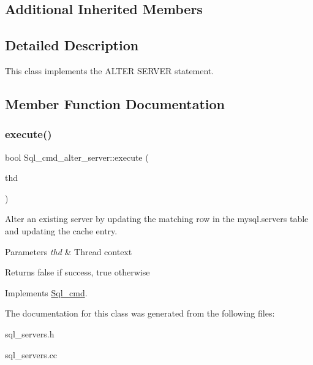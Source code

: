 \subsection*{Additional Inherited Members}


\subsection{Detailed Description}
This class implements the A\+L\+T\+ER S\+E\+R\+V\+ER statement. 

\subsection{Member Function Documentation}
\mbox{\label{classSql__cmd__alter__server_a3f4f8ff26edf3f1780fc7ab7a98ccd2d}} 
\subsubsection{\texorpdfstring{execute()}{execute()}}
{\footnotesize\ttfamily bool Sql\+\_\+cmd\+\_\+alter\+\_\+server\+::execute (\begin{DoxyParamCaption}\item[{T\+HD $\ast$}]{thd }\end{DoxyParamCaption})\hspace{0.3cm}{\ttfamily [virtual]}}

Alter an existing server by updating the matching row in the mysql.\+servers table and updating the cache entry.


\begin{DoxyParams}{Parameters}
{\em thd} & Thread context\\
\hline
\end{DoxyParams}
\begin{DoxyReturn}{Returns}
false if success, true otherwise 
\end{DoxyReturn}


Implements \mbox{\hyperlink{classSql__cmd_a213367b79b551296fbb7790f2a3732fb}{Sql\+\_\+cmd}}.



The documentation for this class was generated from the following files\+:\begin{DoxyCompactItemize}
\item 
sql\+\_\+servers.\+h\item 
sql\+\_\+servers.\+cc\end{DoxyCompactItemize}
